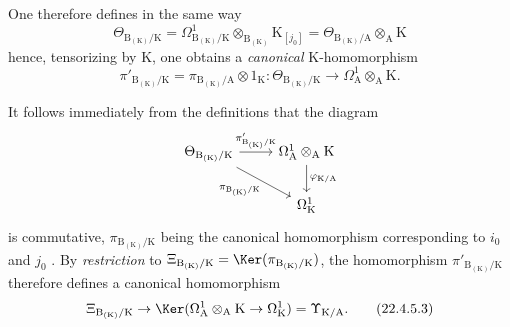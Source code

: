 \begin{env}[22.4.5]
One therefore defines in the same way
\[
  \Theta_{\mathrm{B}_{(\mathrm{K})}/\mathrm{K}}=\Omega^1_{\mathrm{B}_{(\mathrm{K})}/\mathrm{K}}\otimes_{\mathrm{B}_{(\mathrm{K})}}\mathrm{K}_{[j_0]}=\Theta_{\mathrm{B}_{(\mathrm{K})}/\mathrm{A}}\otimes_\mathrm{A}\mathrm{K}
\]
hence, tensorizing  by $\mathrm{K}$, one obtains a \emph{canonical} $\mathrm{K}$-homomorphism
\[
\label{0.22.4.5.2}
  \pi'_{\mathrm{B}_{(\mathrm{K})}/\mathrm{K}}=\pi_{\mathrm{B}_{(\mathrm{K})}/\mathrm{A}}\otimes 1_\mathrm{K}:\Theta_{\mathrm{B}_{(\mathrm{K})}/\mathrm{K}}\to\Omega^1_\mathrm{A}\otimes_\mathrm{A}\mathrm{K}.
  \tag{22.4.5.2}
\]

It follows immediately from the definitions that the diagram
\[
  \begin{tikzcd}
    \Theta_{\mathrm{B}_{(\mathrm{K})}/\mathrm{K}} \ar[r,"\pi'_{\mathrm{B}_{(\mathrm{K})}/\mathrm{K}}"] \ar[dr,"\pi_{\mathrm{B}_{(\mathrm{K})}/\mathrm{K}}",swap] & \Omega^1_\mathrm{A}\otimes_\mathrm{A}\mathrm{K} \ar[d,"\varphi_{\mathrm{K}/\mathrm{A}}"]\\
    & \Omega^1_\mathrm{K}
  \end{tikzcd}
\]
is commutative, $\pi_{\mathrm{B}_{(\mathrm{K})}/\mathrm{K}}$ being the canonical homomorphism corresponding to $i_0$ and $j_0$ .
By \emph{restriction} to $\Xi_{\mathrm{B}_{(\mathrm{K})}/\mathrm{K}}=\Ker(\pi_{\mathrm{B}_{(\mathrm{K})}/\mathrm{K}})$, the homomorphism $\pi'_{\mathrm{B}_{(\mathrm{K})}/\mathrm{K}}$ therefore defines a canonical homomorphism
\[
\label{0.22.4.5.3}
  \Xi_{\mathrm{B}_{(\mathrm{K})}/\mathrm{K}}\to\Ker(\Omega^1_\mathrm{A}\otimes_\mathrm{A}\mathrm{K}\to\Omega^1_\mathrm{K})=\Upsilon_{\mathrm{K}/\mathrm{A}}.
  \tag{22.4.5.3}
\]
\end{env}

